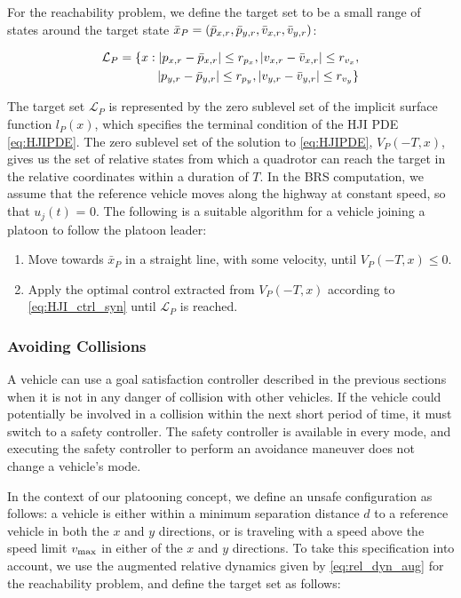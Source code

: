 For the reachability problem, we define the target set to be a small range of states around the target state $\bar x_P = (\bar{p}_{x,r}, \bar{p}_{y,r}, \bar{v}_{x,r}, \bar{v}_{y,r})$:

\begin{equation}
\begin{aligned}
\mathcal{L}_P = \{x: |p_{x,r}-\bar{p}_{x,r}|\le r_{p_x}, |v_{x,r}-\bar{v}_{x,r}|\le r_{v_x}, \\
|p_{y,r} - \bar{p}_{y,r}| \le r_{p_y}, |v_{y,r} - \bar{v}_{y,r}|\le r_{v_y} \}
\end{aligned}
\end{equation}

The target set $\mathcal{L}_P$ is represented by the zero sublevel set of the implicit surface function $l_P(x)$, which specifies the terminal condition of the HJI PDE \eqref{eq:HJIPDE}. The zero sublevel set of the solution to \eqref{eq:HJIPDE}, $V_P(-T,x)$, gives us the set of relative states from which a quadrotor can reach the target in the relative coordinates within a duration of $T$. In the BRS computation, we assume that the reference vehicle moves along the highway at constant speed, so that $u_j(t)$ = 0. The following is a suitable algorithm for a vehicle joining a platoon to follow the platoon leader:

\begin{enumerate}
\item Move towards $\bar{x}_P$ in a straight line, with some velocity, until $V_P(-T,x)\le 0$.
\item Apply the optimal control extracted from $V_P(-T,x)$ according to \eqref{eq:HJI_ctrl_syn} until $\mathcal{L}_P$ is reached.
\end{enumerate}

\subsubsection{Avoiding Collisions \label{sec:collision_ctrl}}
A vehicle can use a goal satisfaction controller described in the previous sections when it is not in any danger of collision with other vehicles. If the vehicle could potentially be involved in a collision within the next short period of time, it must switch to a safety controller. The safety controller is available in every mode, and executing the safety controller to perform an avoidance maneuver does not change a vehicle's mode. 

In the context of our platooning concept, we define an unsafe configuration as follows: a vehicle is either within a minimum separation distance $d$ to a reference vehicle in both the $x$ and $y$ directions, or is traveling with a speed above the speed limit $v_\text{max}$ in either of the $x$ and $y$ directions. To take this specification into account, we use the augmented relative dynamics given by \eqref{eq:rel_dyn_aug} for the reachability problem, and define the target set as follows:


